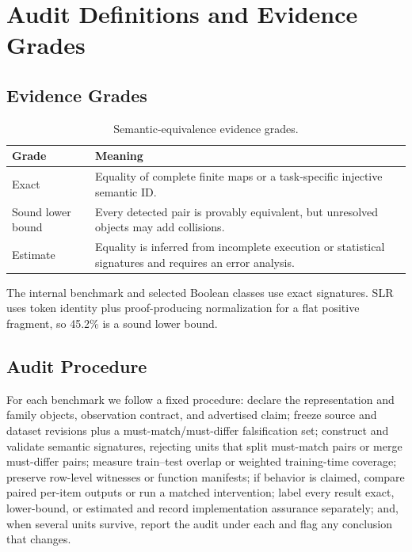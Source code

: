 \raggedbottom

\section{Audit Definitions and Evidence Grades}
\label{app:definitions}

\subsection{Evidence Grades}

\begin{table}[H]
\caption{Semantic-equivalence evidence grades.}
\label{tab:evidence-grades}
\centering
\small
\begin{tabular}{L{0.85in}p{1.85in}}
\toprule
Grade & Meaning \\
\midrule
Exact & Equality of complete finite maps or a task-specific injective semantic ID. \\
Sound lower bound & Every detected pair is provably equivalent, but unresolved objects may add collisions. \\
Estimate & Equality is inferred from incomplete execution or statistical signatures and requires an error analysis. \\
\bottomrule
\end{tabular}
\end{table}

The internal benchmark and selected Boolean classes use exact signatures.
SLR \cite{helff2026slr} uses token identity plus proof-producing normalization for a flat positive
fragment, so 45.2\% is a sound lower bound.

\subsection{Audit Procedure}

For each benchmark we follow a fixed procedure: declare the representation and
family objects, observation contract, and advertised claim; freeze source and
dataset revisions plus a must-match/must-differ falsification set; construct
and validate semantic signatures, rejecting units that split must-match pairs
or merge must-differ pairs; measure train--test overlap or weighted
training-time coverage; preserve row-level witnesses or function manifests;
if behavior is claimed, compare paired per-item outputs or run a matched
intervention; label every result exact, lower-bound, or estimated and record
implementation assurance separately; and, when several units survive, report
the audit under each and flag any conclusion that changes.

